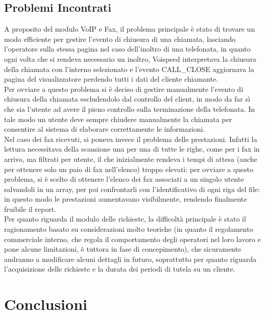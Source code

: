 \section{Problemi Incontrati}
A proposito del modulo VoIP e Fax, il problema principale \`e stato di trovare un modo efficiente per gestire l'evento di chiusura di una chiamata, lasciando l'operatore sulla stessa pagina nel caso dell'inoltro di una telefonata, in quanto ogni volta che si rendeva necessario un inoltro, Voispeed interpretava la chiusura della chiamata con l'interno selezionato e  l'evento CALL\_CLOSE aggiornava la pagina del visualizzatore perdendo tutti i dati del cliente chiamante. \\
Per ovviare a questo problema si \`e deciso di gestire manualmente l'evento di chiusura della chiamata escludendolo dal controllo del client, in modo da far s\`i che sia l'utente ad avere il pieno controllo sulla terminazione della telefonata. In tale modo un utente deve sempre chiudere manualmente la chiamata per consentire al sistema di elaborare correttamente le informazioni.\\
Nel caso dei fax ricevuti, si poneva invece il problema delle prestazioni. Infatti la lettura necessitava della scansione una per una di tutte le righe, come per i fax in arrivo, ma filtrati per utente, il che inizialmente rendeva i tempi di attesa (anche per ottenere solo un paio di fax nell'elenco) troppo elevati: per ovviare a questo problema, si \`e scelto di ottenere l'elenco dei fax associati a un singolo utente salvandoli in un array, per poi confrontarli con l'identificativo di ogni riga del file: in questo modo le prestazioni aumentavano visibilmente, rendendo finalmente fruibile il report. \\
Per quanto riguarda il modulo delle richieste, la difficolt\`a principale \`e stato il ragionamento basato su considerazioni molto teoriche (in quanto il regolamento commerciale interno, che regola il comportamento degli operatori nel loro lavoro e pone alcune limitazioni, \`e tuttora in fase di concepimento), che sicuramente andranno a modificare alcuni dettagli in futuro, soprattutto per quanto riguarda l'acquisizione delle richieste e la durata dei periodi di tutela su un cliente.

\chapter{Conclusioni}

